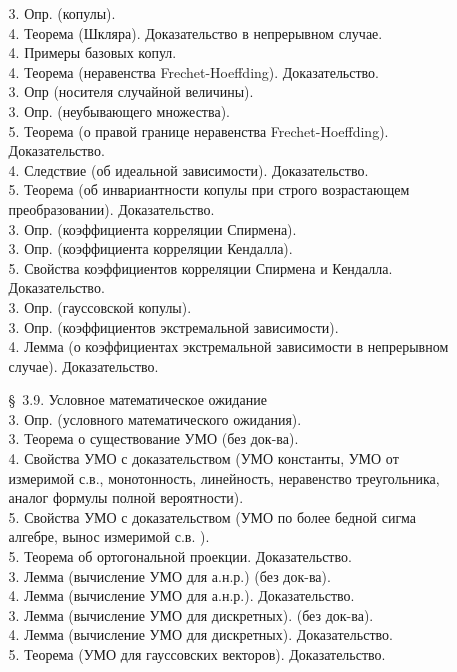 \documentclass[10pt]{amsart}
\begin{document}
\begin{enumerate}
\begin{enumerate}
3. Опр. (копулы). \\
4. Теорема (Шкляра). Доказательство в непрерывном случае. \\
4. Примеры базовых копул. \\
4. Теорема (неравенства Frechet-Hoeffding). Доказательство. \\
3. Опр (носителя случайной величины). \\
3. Опр. (неубывающего множества). \\
5. Теорема (о правой границе неравенства Frechet-Hoeffding).  Доказательство. \\
4. Следствие (об идеальной зависимости). Доказательство. \\
5. Теорема (об инвариантности копулы при строго возрастающем преобразовании). Доказательство. \\
3. Опр. (коэффициента корреляции Спирмена). \\
3. Опр. (коэффициента корреляции Кендалла). \\
5. Свойства коэффициентов корреляции Спирмена и Кендалла. Доказательство. \\ 
3. Опр. (гауссовской копулы). \\
3. Опр. (коэффициентов экстремальной зависимости). \\
4. Лемма (о коэффициентах экстремальной зависимости в непрерывном случае). Доказательство. \\
 
 
 
 
\item[\S\, 3.9.] Условное математическое ожидание \\
3. Опр. (условного математического ожидания). \\
3. Теорема о существование УМО (без док-ва). \\
4. Свойства УМО с доказательством (УМО константы, УМО от измеримой с.в., монотонность,  линейность, неравенство треугольника,  аналог формулы полной вероятности). \\
5. Свойства УМО с доказательством (УМО по более бедной сигма алгебре, вынос измеримой с.в. ). \\
5. Теорема об ортогональной проекции. Доказательство. \\
3. Лемма (вычисление УМО для а.н.р.)  (без док-ва). \\
4. Лемма (вычисление УМО для а.н.р.). Доказательство. \\
3. Лемма (вычисление УМО для дискретных). (без док-ва). \\
4. Лемма (вычисление УМО для дискретных). Доказательство. \\
5. Теорема (УМО для гауссовских векторов). Доказательство. \\


\end{enumerate}
\end{enumerate}
\end{document}
